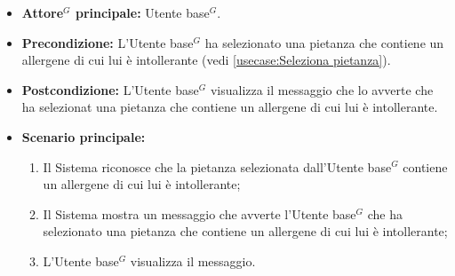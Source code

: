 \label{usecase:Visualizzazione messaggio di selezione di una pietanza con allergene}
\begin{itemize}
	\item \textbf{\gls{Attore}$^G$ principale:} \gls{Utente base}$^G$.

	\item \textbf{Precondizione:}
	      L'\gls{Utente base}$^G$ ha selezionato una pietanza che contiene un allergene di cui lui è intollerante (vedi \autoref{usecase:Seleziona pietanza}).

	\item \textbf{Postcondizione:}
	      L'\gls{Utente base}$^G$ visualizza il messaggio che lo avverte che ha selezionat una pietanza che contiene un allergene di cui lui è intollerante.

	\item \textbf{Scenario principale:}
	      \begin{enumerate}
		      \item Il Sistema riconosce che la pietanza selezionata dall'\gls{Utente base}$^G$ contiene un allergene di cui lui è intollerante;
		      \item Il Sistema mostra un messaggio che avverte l'\gls{Utente base}$^G$ che ha selezionato una pietanza che contiene un allergene di cui lui è intollerante;
		      \item L'\gls{Utente base}$^G$ visualizza il messaggio.
	      \end{enumerate}
\end{itemize}
